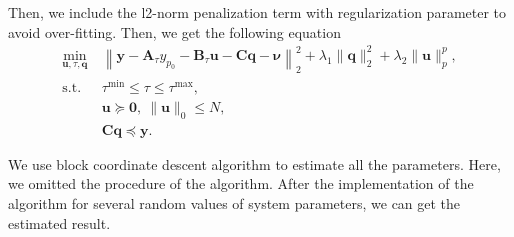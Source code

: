 \documentclass[]{article}
\begin{document}
Then, we include the l2-norm penalization term with regularization parameter to avoid over-fitting. Then, we get the following equation
\begin{subequations}
  \renewcommand{\theequation}
  {\theparentequation-\arabic{equation}}
  \begin{align}
  \min\limits_{\mathbf{u}, \tau, \mathbf{q}}~&\left\lVert \mathbf{y} - \mathbf{A}_\tau y_{p_0} - \mathbf{B}_\tau \mathbf{u} - \mathbf{C} \mathbf{q} - \boldsymbol{\nu} \right\lVert^2_2 + \lambda_1 \lVert \mathbf{q} \rVert_2^2 + \lambda_2 \lVert \mathbf{u} \rVert_p^p, \\
  \mathrm{s.t.}~& \tau^{\mathrm{min}} \leqslant \tau \leqslant \tau^{\mathrm{max}}, \\
  & \mathbf{u} \succcurlyeq \mathbf{0},~ \lVert \mathbf{u} \rVert_0 \leqslant N, \\
  & \mathbf{C}\mathbf{q} \preccurlyeq \mathbf{y}.
  \end{align}
\end{subequations}

We use block coordinate descent algorithm to estimate all the parameters. Here, we omitted the procedure of the algorithm. After the implementation of the algorithm for several random values of system parameters, we can get the estimated result.
\end{document}
